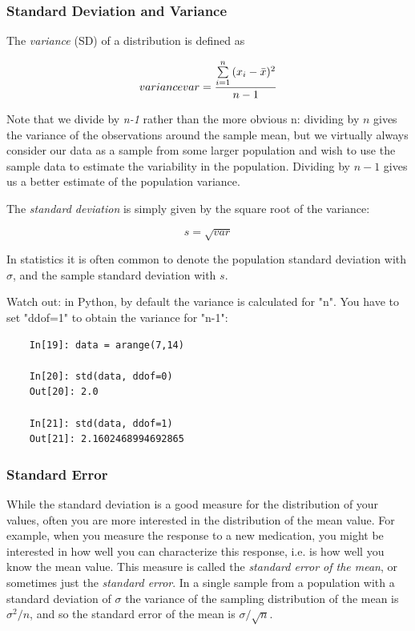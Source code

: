 \subsubsection{ Standard Deviation and Variance }
The \emph{variance} (SD) of a distribution is defined as

\begin{equation}\label{eq_variance} \index{general}{variance}
  var = \frac{{\sum\limits_{i = 1}^n {({x_i-\bar{x}})^2} }}{n-1}
\end{equation}

Note that we divide by \emph{n-1} rather than the more obvious n: dividing by $n$ gives the variance of the observations around the sample mean, but we virtually always consider our data as a sample from some larger population and wish to use the sample data to estimate the variability in the population. Dividing by $n-1$ gives us a better estimate of the population variance.

The \emph{standard deviation}  is simply given by the square root of the variance:

\begin{equation}
  s = \sqrt{var}
\end{equation}

In statistics it is often common to denote the population standard deviation with $\sigma$, and the sample standard deviation with $s$.

Watch out: in Python, by default the variance is calculated for "n". You have to set "ddof=1" to obtain the variance for "n-1":

\begin{lstlisting}
    In[19]: data = arange(7,14)

    In[20]: std(data, ddof=0)
    Out[20]: 2.0

    In[21]: std(data, ddof=1)
    Out[21]: 2.1602468994692865
\end{lstlisting}

\subsubsection{ Standard Error } 
While the standard deviation is a good measure for the distribution of your values, often you are more interested in the distribution of the mean value. For example, when you measure the response to a new medication, you might be interested in how well you can characterize this response, i.e. is how well you know the mean value. This measure is called the \emph{standard error of the mean}, or sometimes just the \emph{standard error}. In a single sample from a population with a standard deviation of $\sigma$ the variance of the sampling distribution of the mean is $\sigma^2/n$, and so the standard error of the mean is $\sigma/\sqrt{n}$.

